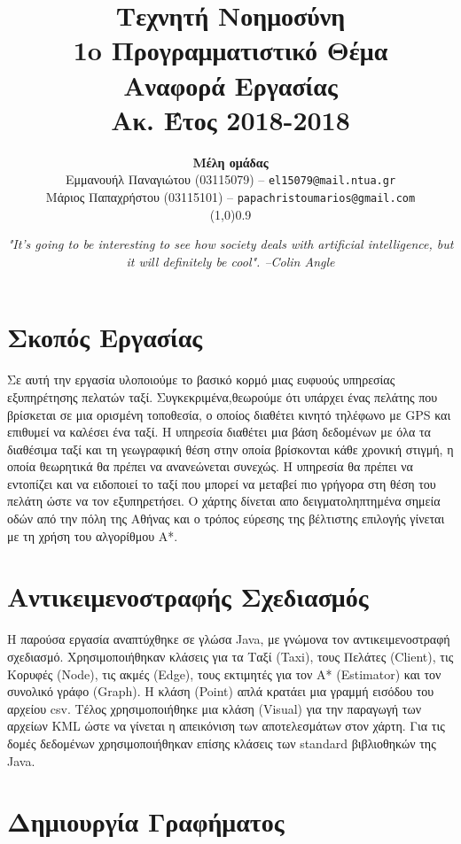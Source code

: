 \documentclass[a4paper,oneside,12pt]{article}
\title{ \textbf{Τεχνητή Νοημοσύνη}  \\ 1o Προγραμματιστικό Θέμα \\ Αναφορά Εργασίας \\ \small{Ακ. Έτος 2018-2018}}
\author{\textbf{Μέλη ομάδας} \\ Εμμανουήλ Παναγιώτου (03115079) -- \texttt{el15079@mail.ntua.gr} \\  Μάριος Παπαχρήστου (03115101) -- \texttt{papachristoumarios@gmail.com}   \\ \line(1,0){0.9\textwidth}}
\date{\emph{"It's going to be interesting to see how society deals with artificial intelligence, but it will definitely be cool". --Colin Angle}}
\begin{document}
\maketitle

\section{Σκοπός Εργασίας} 

Σε αυτή την εργασία υλοποιούμε το βασικό κορμό μιας ευφυούς υπηρεσίας εξυπηρέτησης πελατών ταξί. Συγκεκριμένα,θεωρούμε ότι υπάρχει ένας πελάτης που βρίσκεται σε μια ορισμένη τοποθεσία, ο οποίος διαθέτει κινητό τηλέφωνο με GPS και επιθυμεί να καλέσει ένα ταξί. Η υπηρεσία διαθέτει μια βάση δεδομένων με όλα τα διαθέσιμα ταξί και τη γεωγραφική θέση στην
οποία βρίσκονται κάθε χρονική στιγμή, η οποία θεωρητικά θα πρέπει να ανανεώνεται συνεχώς. Η υπηρεσία θα πρέπει να εντοπίζει και να ειδοποιεί το ταξί που μπορεί να μεταβεί πιο γρήγορα στη θέση του πελάτη ώστε να τον εξυπηρετήσει. Ο χάρτης δίνεται απο δειγματοληπτημένα σημεία οδών από την πόλη της Αθήνας και ο τρόπος εύρεσης της βέλτιστης επιλογής γίνεται με τη χρήση του αλγορίθμου Α*. 

\section{Αντικειμενοστραφής Σχεδιασμός} 

Η παρούσα εργασία αναπτύχθηκε σε γλώσα Java, με γνώμονα τον αντικειμενοστραφή σχεδιασμό. Χρησιμοποιήθηκαν κλάσεις για τα Ταξί (Taxi), τους Πελάτες (Client), τις Κορυφές (Node), τις ακμές (Edge), τους εκτιμητές για τον Α* (Estimator) και τον συνολικό γράφο (Graph). Η κλάση (Point) απλά κρατάει μια γραμμή εισόδου του αρχείου csv. Τέλος χρησιμοποιήθηκε μια κλάση (Visual) για την παραγωγή των αρχείων KML ώστε να γίνεται η απεικόνιση των αποτελεσμάτων στον χάρτη. Για τις δομές δεδομένων χρησιμοποιήθηκαν επίσης κλάσεις των standard βιβλιοθηκών της Java. 

\section{Δημιουργία Γραφήματος}
\end{document}
